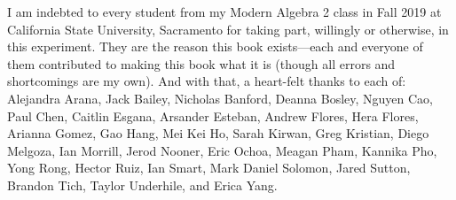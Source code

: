 \documentclass[12pt,oneside]{book}
\theoremstyle{definition}
\begin{document}
\bigskip

\noindent I am  indebted to every student from my Modern Algebra 2 class in Fall 2019 at California State University, Sacramento for taking part, willingly or otherwise, in this experiment. They are the reason this book exists---each and everyone of them contributed to making this book what it is (though all errors and shortcomings are my own). And with that, a heart-felt thanks to each of: Alejandra Arana, Jack Bailey, Nicholas Banford, Deanna Bosley, Nguyen Cao, Paul Chen, Caitlin Esgana, Arsander Esteban, Andrew Flores, Hera Flores, Arianna Gomez, Gao Hang, Mei Kei Ho, Sarah Kirwan, Greg Kristian, Diego Melgoza, Ian Morrill, Jerod Nooner, Eric Ochoa, Meagan Pham, Kannika Pho, Yong Rong, Hector Ruiz, Ian Smart, Mark Daniel Solomon, Jared Sutton, Brandon Tich, Taylor Underhile, and Erica Yang. 



\tableofcontents









\appendix

\end{document}
